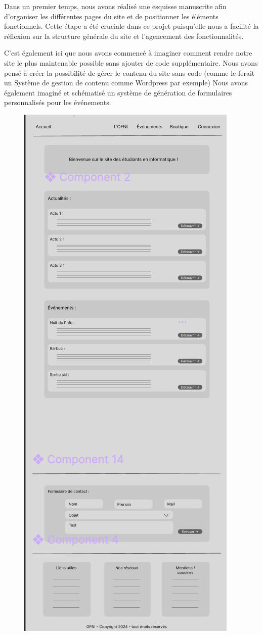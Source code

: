 Dans un premier temps, nous avons réalisé une esquisse manuscrite afin d’organiser les différentes pages du site et de positionner les éléments fonctionnels. Cette étape a été cruciale dans ce projet puisqu'elle nous a facilité la réflexion sur la structure générale du site et l'agencement des fonctionnalités.

C'est également ici que nous avons commencé à imaginer comment rendre notre site le plus maintenable possible sans ajouter de code supplémentaire. Nous avons pensé à créer la possibilité de gérer le contenu du site sans code (comme le ferait un Système de gestion de contenu comme Wordpress par exemple)
Nous avons également imaginé et schématisé un système de génération de formulaires personnalisés pour les événements.

\begin{figure}[H]
    \centering
    \includegraphics[scale=0.5]{assets/pictures/figma.png}

\end{figure}
